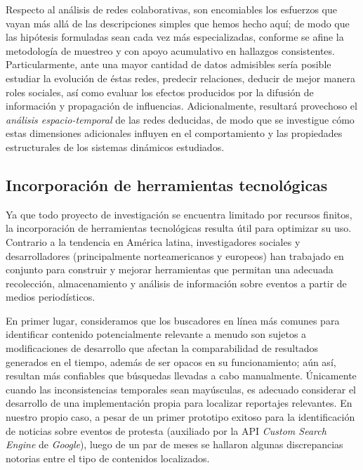 \documentclass[letterpaper, 11pt]{book}
\theoremstyle{definition}
\theoremstyle{remark}
\begin{document}
Respecto al análisis de redes colaborativas, son encomiables los esfuerzos que vayan más allá de las descripciones simples que hemos hecho aquí; de modo que las hipótesis formuladas sean cada vez más especializadas, conforme se afine la metodología de muestreo y con apoyo acumulativo en hallazgos consistentes. 
Particularmente, ante una mayor cantidad de datos admisibles sería posible estudiar la evolución de éstas redes, predecir relaciones, deducir de mejor manera roles sociales, así como evaluar los efectos producidos por la difusión de información y propagación de influencias. 
Adicionalmente, resultará provechoso el \emph{análisis espacio-temporal} de las redes deducidas, de modo que se investigue cómo estas dimensiones adicionales influyen en el comportamiento y las propiedades estructurales de los sistemas dinámicos estudiados. 









\subsection{Incorporación de herramientas tecnológicas}
\label{subsec:Posterior_Tecnología}

Ya que todo proyecto de investigación se encuentra limitado por recursos finitos, la incorporación de herramientas tecnológicas resulta útil para optimizar su uso. 
Contrario a la tendencia en América latina, investigadores sociales y desarrolladores (principalmente norteamericanos y europeos) han trabajado en conjunto para construir y mejorar herramientas que permitan una adecuada recolección, almacenamiento y análisis de información sobre eventos a partir de medios periodísticos. 


En primer lugar, consideramos que los buscadores en línea más comunes para identificar contenido potencialmente relevante a menudo son sujetos a modificaciones de desarrollo que afectan la comparabilidad de resultados generados en el tiempo, además de ser opacos en su funcionamiento; aún así, resultan más confiables que búsquedas llevadas a cabo manualmente. 
Únicamente cuando las inconsistencias temporales sean mayúsculas, es adecuado considerar el desarrollo de una implementación propia para localizar reportajes relevantes. 
En nuestro propio caso, a pesar de un primer prototipo exitoso para la identificación de noticias sobre eventos de protesta (auxiliado por la API \emph{Custom Search Engine} de \emph{Google}), luego de un par de meses se hallaron algunas discrepancias notorias entre el tipo de contenidos localizados.
\end{document}
